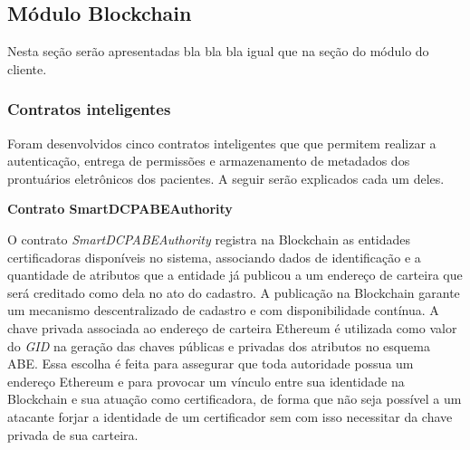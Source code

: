 \documentclass[a4paper,11pt]{article}
\begin{document}
\subsection{Módulo Blockchain}

{\color{magenta}Nesta seção serão apresentadas bla bla bla igual que na seção do módulo do cliente.}

\subsubsection{Contratos inteligentes}
\label{sec:sub:ImplementacaoSmartContracts}

Foram desenvolvidos cinco contratos inteligentes que que permitem realizar a autenticação, entrega de permissões e armazenamento de metadados dos prontuários eletrônicos dos pacientes.
A seguir serão explicados cada um deles.

\textbf{Contrato SmartDCPABEAuthority}



O contrato \emph{SmartDCPABEAuthority} registra na Blockchain as entidades certificadoras disponíveis no sistema, associando dados de identificação e a quantidade de atributos que a entidade já publicou a um endereço de carteira que será creditado como dela no ato do cadastro.
A publicação na Blockchain garante um mecanismo descentralizado de cadastro e com disponibilidade contínua.
A chave privada associada ao endereço de carteira Ethereum é utilizada como valor do \emph{GID} na geração das chaves públicas e privadas dos atributos no esquema ABE.
Essa escolha é feita para assegurar que toda autoridade possua um endereço Ethereum e para provocar um vínculo entre sua identidade na Blockchain e sua atuação como certificadora, de forma que não seja possível a um atacante forjar a identidade de um certificador sem com isso necessitar da chave privada de sua carteira.

\end{document}
